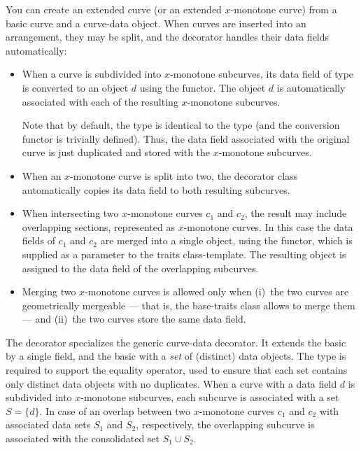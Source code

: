 You can create an extended curve (or an extended $x$-monotone curve)
from a basic curve and a curve-data object. When curves are
inserted into an arrangement, they may be split, and the
decorator handles their data fields automatically:
\begin{itemize}
\item When a curve is subdivided into $x$-monotone subcurves, its
data field of type  is converted to an 
object $d$ using the  functor. The object $d$ is automatically
associated with each of the resulting $x$-monotone subcurves.

Note that by default, the  type is identical to the
 type (and the conversion functor 
is trivially defined). Thus, the data field associated with the original
curve is just duplicated and stored with the $x$-monotone subcurves.
%
\item When an $x$-monotone curve is split into two, the decorator
class automatically copies its data field to both resulting subcurves.
%
\item When intersecting two $x$-monotone curves $c_1$ and $c_2$, the
result may include overlapping sections, represented as
$x$-monotone curves. In this case the data fields of $c_1$ and $c_2$
are merged into a single  object,
using the  functor, which is supplied as a
parameter to the traits class-template. The resulting object is
assigned to the data field of the overlapping subcurves.
%
\item Merging two $x$-monotone curves is allowed only when (i)~the two
curves are geometrically mergeable --- that is, the base-traits class
allows to merge them --- and (ii)~the two curves store the same data field.
\end{itemize}

The  decorator
specializes the generic curve-data decorator. It extends the basic
 by a single  field, and the basic
 with a {\em set} of (distinct) data 
objects. The  type is required to support the equality operator, 
used to ensure that each set contains only distinct data objects with no 
duplicates.
When a curve with a data field $d$ is subdivided into $x$-monotone subcurves,
each subcurve is associated with a set $S = \{ d \}$. In case of an overlap
between two $x$-monotone curves $c_1$ and $c_2$ with associated data sets
$S_1$ and $S_2$, respectively, the overlapping subcurve is associated with
the consolidated set $S_1 \cup S_2$.

